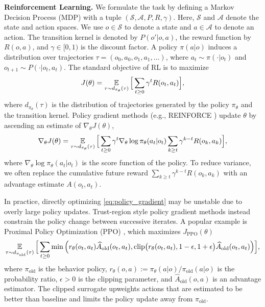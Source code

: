 

\textbf{Reinforcement Learning.}
We formulate the task by defining a Markov Decision Process (MDP) \cite{sutton1998reinforcement} with a tuple $(\mathcal{S}, \mathcal{A}, P, R, \gamma)$.
Here, $\mathcal{S}$ and $\mathcal{A}$ denote the state and action spaces.
We use $o \in \mathcal{S}$ to denote a state and $a \in \mathcal{A}$ to denote an action.
The transition kernel is denoted by $P(o' | o,a)$, the reward function by $R(o,a)$,
and $\gamma \in [0,1)$ is the discount factor.
A policy $\pi(a | o)$ induces a distribution over trajectories
$\tau = (o_0,a_0,o_1,a_1,\ldots)$, where $a_t \sim \pi(\cdot | o_t)$
and $o_{t+1} \sim P(\cdot | o_t,a_t)$.
The standard objective of RL is to maximize
\begin{align}
\label{eq:rl_objective_prelim}
    J(\theta)
    =
    \operatorname*{{\mathbb{E}}}_{\tau \sim d_{\pi_\theta}(\tau)}
    \Big[
    \sum_{t \ge 0} \gamma^t R(o_t,a_t)
\Big],
\end{align}
where $d_{\pi_\theta}(\tau)$ is the distribution of trajectories generated by the policy $\pi_\theta$ and the transition kernel.
Policy gradient methods (e.g., REINFORCE \cite{williams1992simple}) update $\theta$ by ascending an estimate of $\nabla_\theta J(\theta)$,
\begin{align}
\label{eq:policy_gradient}
    \nabla_\theta J(\theta)
    =
    \operatorname*{{\mathbb{E}}}_{\tau \sim d_{\pi_\theta}(\tau)}
    \Big[\sum_{t\ge 0} \gamma^t
        \nabla_\theta \log \pi_\theta(a_t | o_t)
        \sum_{k\ge t}\gamma^{k-t} R(o_k,a_k)
    \Big],
\end{align}
where $\nabla_\theta \log \pi_\theta(a_t | o_t)$ is the score function of the policy.
To reduce variance, we often replace the cumulative future reward $\sum_{k\ge t}\gamma^{k-t} R(o_k,a_k)$ with an advantage estimate $A(o_t,a_t)$.

In practice, directly optimizing \eqref{eq:policy_gradient}
may be unstable due to overly large policy updates.
Trust-region style policy gradient methods \cite{schulman2015trust,schulman2017proximal,shao2024deepseekmath} instead constrain the policy change between successive iterates.
A popular example is Proximal Policy Optimization (PPO) \cite{schulman2017proximal}, which maximizes $J_{\mathrm{PPO}}(\theta)$
\begin{align}
    \operatorname*{{\mathbb{E}}}_{\tau \sim d_{\pi_{\text{old}}}(\tau)}
    \Big[
        \sum_{t\ge 0}
        \min\Big(
            r_\theta(o_t,a_t)\widehat{A}_{\mathrm{old}}(o_t,a_t),
            \mathrm{clip}\big(r_\theta(o_t,a_t),1-\epsilon,
            1+\epsilon\big)\widehat{A}_{\mathrm{old}}(o_t,a_t)
        \Big)
    \Big],
    \label{eq:ppo}
\end{align}
where $\pi_{\mathrm{old}}$ is the behavior policy, $r_\theta(o,a):=\pi_\theta(a|o)/\pi_{\mathrm{old}}(a|o)$ is the probability ratio, $\epsilon>0$ is the clipping parameter, and $\hat{A}_{\mathrm{old}}(o,a)$ is an advantage estimator.
The clipped surrogate upweights actions that are estimated to be better than baseline and limits the policy update away from $\pi_{\mathrm{old}}$.

